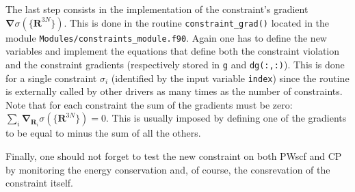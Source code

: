 \documentclass[a4paper,12pt,notitlepage]{report}
\newcommand{\Rb}{\mathbf R}
\newcommand{\nb}{\boldsymbol \nabla}
\begin{document}
The last step consists in the implementation of the constraint's gradient
$\nb\sigma(\{\Rb^{3N}\})$. This is done in the routine
\texttt{constraint\_grad()} located in the module
\texttt{Modules/constraints\_module.f90}. Again one has to define the new
variables and implement the equations that define both the constraint violation
and the constraint gradients (respectively stored in \texttt{g} and
\texttt{dg(:,:)}). This is done for a single constraint $\sigma_i$ (identified
by the input variable \texttt{index}) since the routine is externally called by
other drivers as many times as the number of constraints. Note that for each
constraint the sum of the gradients must be zero: $\sum_{i}
\nb_{\Rb_i}\sigma(\{\Rb^{3N}\}) = 0$. This is usually imposed by defining one of
the gradients to be equal to minus the sum of all the others.

Finally, one should not forget to test the new constraint on both PWscf and CP
by monitoring the energy conservation and, of course, the consrevation of the
constraint itself.
\end{document}
